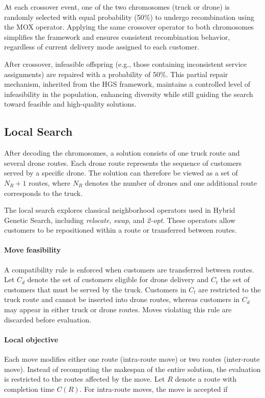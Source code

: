 \documentclass[3p, authoryear, 11pt]{elsarticle}
\begin{document}
At each crossover event, one of the two chromosomes (truck or drone) is randomly selected with equal probability (50\%) to undergo recombination using the MOX operator.
Applying the same crossover operator to both chromosomes simplifies the framework and ensures consistent recombination behavior, regardless of current delivery mode assigned to each customer.

After crossover, infeasible offspring (e.g., those containing inconsistent service assignments) are repaired with a probability of 50\%. This partial repair mechanism, inherited from the HGS framework, maintains a controlled level of infeasibility in the population, enhancing diversity while still guiding the search toward feasible and high-quality solutions.

\subsection{Local Search}
After decoding the chromosomes, a solution consists of one truck route and several drone routes. 
Each drone route represents the sequence of customers served by a specific drone. 
The solution can therefore be viewed as a set of $N_R + 1$ routes, where $N_R$ denotes the number of drones and one additional route corresponds to the truck.

The local search explores classical neighborhood operators used in Hybrid Genetic Search, including \textit{relocate}, \textit{swap}, and \textit{2-opt}. 
These operators allow customers to be repositioned within a route or transferred between routes.

\paragraph{Move feasibility}
A compatibility rule is enforced when customers are transferred between routes. 
Let $C_d$ denote the set of customers eligible for drone delivery and $C_t$ the set of customers that must be served by the truck. 
Customers in $C_t$ are restricted to the truck route and cannot be inserted into drone routes, whereas customers in $C_d$ may appear in either truck or drone routes. 
Moves violating this rule are discarded before evaluation.

\paragraph{Local objective}
Each move modifies either one route (intra-route move) or two routes (inter-route move). 
Instead of recomputing the makespan of the entire solution, the evaluation is restricted to the routes affected by the move. 
Let $R$ denote a route with completion time $C(R)$. 
For intra-route moves, the move is accepted if
\end{document}
